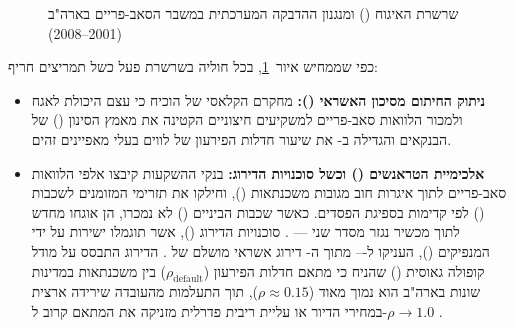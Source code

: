 \begin{figure}[htbp]
\begin{english}
\end{english}
\caption{שרשרת האיגוח () ומנגנון ההדבקה המערכתית במשבר הסאב-פריים בארה"ב (\num{2001}--\num{2008}) \cite{keys2010did,gorton2009securitized}}
\label{fig:otd_securitization_chain}
\end{figure}

כפי שממחיש איור~\ref{fig:otd_securitization_chain}, בכל חוליה בשרשרת פעל כשל תמריצים חריף:
\begin{itemize}[rightmargin=0.6cm]
  \item \textbf{ניתוק החיתום מסיכון האשראי ():} מחקרם הקלאסי של  \cite{keys2010did} הוכיח כי עצם היכולת לאגח ולמכור הלוואות סאב-פריים למשקיעים חיצוניים הקטינה את מאמץ הסינון () של הבנקאים והגדילה ב- את שיעור חדלות הפירעון של לווים בעלי מאפיינים זהים.
  \item \textbf{אלכימיית הטראנשים () וכשל סוכנויות הדירוג:} בנקי ההשקעות קיבצו אלפי הלוואות סאב-פריים לתוך איגרות חוב מגובות משכנתאות (), וחילקו את תזרימי המזומנים לשכבות () לפי קדימות בספיגת הפסדים. כאשר שכבות הביניים () לא נמכרו, הן אוגחו מחדש לתוך מכשיר נגזר מסדר שני —  \cite{gorton2009securitized}. סוכנויות הדירוג (), אשר תוגמלו ישירות על ידי המנפיקים (), העניקו ל--- מתוך ה- דירוג אשראי מושלם של . הדירוג התבסס על מודל קופולה גאוסית () שהניח כי מתאם חדלות הפירעון ($\rho_{\text{default}}$) בין משכנתאות במדינות שונות בארה"ב הוא נמוך מאוד ($\rho \approx 0.15$), תוך התעלמות מהעובדה שירידה ארצית במחירי הדיור או עליית ריבית פדרלית מזניקה את המתאם קרוב ל-$\rho \to 1.0$ \cite{gorton2009securitized,reinhart2009this}.
\end{itemize}

